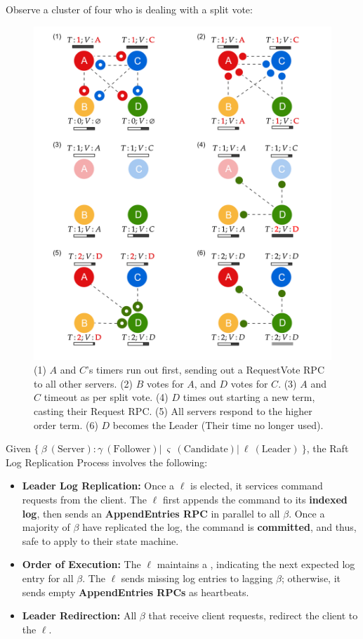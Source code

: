 \newpage

\noindent
Observe a cluster of four who is dealing with a split vote:
\begin{figure}[h]
    \centering
    \includegraphics[width=.9\textwidth]{Sections/raft/split.png}
    \caption{(1) $A$ and $C$'s timers run out first, sending out a RequestVote RPC to all other servers. (2) $B$ votes for $A$, and $D$ votes for $C$. (3) $A$ and $C$ timeout as per split vote. 
    (4) $D$ times out starting a new term, casting their Request RPC. (5) All servers respond to the higher order term. (6) $D$ becomes the Leader (Their time no longer used).}
\end{figure}

\newpage
\begin{Def}

    Given $\{\ \beta\ (\text{Server}): \gamma\ (\text{Follower})  |\ \varsigma\ (\text{Candidate}) |\ \ell\ (\text{Leader})\ \}$, the Raft Log Replication Process involves the following:
    \begin{itemize}
        \item \textbf{Leader Log Replication:} Once a $\ell$ is elected, it services command requests from the client. The $\ell$ first appends the command to its \textbf{indexed log},
        then sends an \textbf{AppendEntries RPC} in parallel to all $\beta$. Once a majority of $\beta$ have replicated the log, the command is \textbf{committed}, and thus, safe to apply to their state machine. 
        \item \textbf{Order of Execution:} The $\ell$ maintains a ,
        indicating the next expected log entry for all $\beta$. The $\ell$ sends missing log entries to lagging $\beta$; otherwise, it sends empty \textbf{AppendEntries RPCs} as heartbeats.
        \item \textbf{Leader Redirection:} All $\beta$ that receive client requests, redirect the client to the $\ell$. 
    \end{itemize}
\end{Def}

